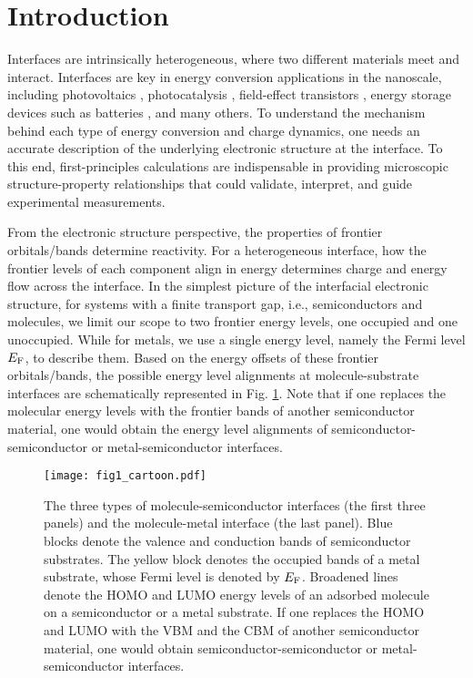 \documentclass[aip, amsmath, amssymb, reprint, longbibliography]{revtex4-2}
\begin{document}
\tableofcontents

\section{Introduction}

Interfaces are intrinsically heterogeneous, where two different materials meet and interact. Interfaces are key in energy conversion applications in the nanoscale, including photovoltaics \cite{GHS14}, photocatalysis \cite{WLD19}, field-effect transistors \cite{LHD19}, energy storage devices such as batteries \cite{GP13}, and many others. To understand the mechanism behind each type of energy conversion and charge dynamics, one needs an accurate description of the underlying electronic structure at the interface. To this end, first-principles calculations are indispensable in providing microscopic structure-property relationships that could validate, interpret, and guide experimental measurements.

From the electronic structure perspective, the properties of frontier orbitals/bands determine reactivity. For a heterogeneous interface, how the frontier levels of each component align in energy determines charge and energy flow across the interface. In the simplest picture of the interfacial electronic structure, for systems with a finite transport gap, i.e., semiconductors and molecules, we limit our scope to two frontier energy levels, one occupied and one unoccupied. While for metals, we use a single energy level, namely the Fermi level $E_{\rm F}$, to describe them. Based on the energy offsets of these frontier orbitals/bands, the possible energy level alignments at molecule-substrate interfaces are schematically represented in Fig. \ref{fig:types}. Note that if one replaces the molecular energy levels with the frontier bands of another semiconductor material, one would obtain the energy level alignments of semiconductor-semiconductor or metal-semiconductor interfaces.

\begin{figure*}[htp]
\centering
\texttt{[image: fig1\_cartoon.pdf]}
\caption{The three types of molecule-semiconductor interfaces (the first three panels) and the molecule-metal interface (the last panel). Blue blocks denote the valence and conduction bands of semiconductor substrates. The yellow block denotes the occupied bands of a metal substrate, whose Fermi level is denoted by $E_{\rm F}$. Broadened lines denote the HOMO and LUMO energy levels of an adsorbed molecule on a semiconductor or a metal substrate. If one replaces the HOMO and LUMO with the VBM and the CBM of another semiconductor material, one would obtain semiconductor-semiconductor or metal-semiconductor interfaces.}
\label{fig:types}
\end{figure*}
\end{document}
